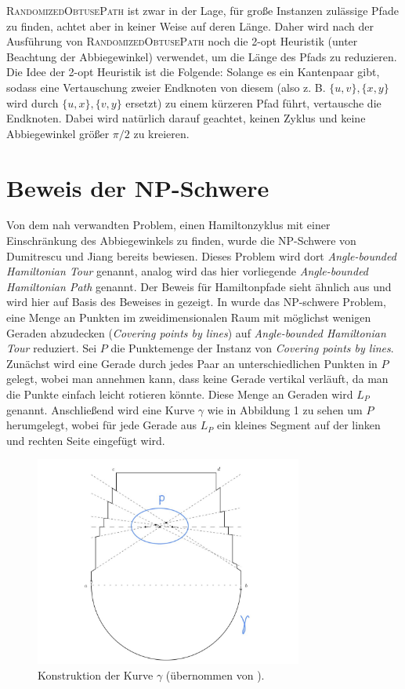 \documentclass[a4paper, 10pt, ngerman]{article}
\begin{document}
\textsc{RandomizedObtusePath} ist zwar in der Lage, für große Instanzen zulässige Pfade zu finden, achtet aber in keiner Weise auf deren Länge. Daher wird nach der Ausführung von \textsc{RandomizedObtusePath} noch die 2-opt Heuristik (unter Beachtung der Abbiegewinkel) verwendet, um die Länge des Pfads zu reduzieren. Die Idee der 2-opt Heuristik ist die Folgende: Solange es ein Kantenpaar gibt, sodass eine Vertauschung zweier Endknoten von diesem (also z. B. $\{u, v\}, \{x, y\}$ wird durch $\{u, x\}, \{v, y\}$ ersetzt) zu einem kürzeren Pfad führt, vertausche die Endknoten. Dabei wird natürlich darauf geachtet, keinen Zyklus und keine Abbiegewinkel größer $\pi / 2$ zu kreieren.

\section{Beweis der NP-Schwere}

Von dem nah verwandten Problem, einen Hamiltonzyklus mit einer Einschränkung des  Abbiegewinkels zu finden, wurde die NP-Schwere von Dumitrescu und Jiang \cite{nphard} bereits bewiesen. Dieses Problem wird dort \emph{Angle-bounded Hamiltonian Tour} genannt, analog wird das hier vorliegende \emph{Angle-bounded Hamiltonian Path} genannt. Der Beweis für Hamiltonpfade sieht ähnlich aus und wird hier auf Basis des Beweises in \cite{nphard} gezeigt. In \cite{nphard} wurde das NP-schwere Problem, eine Menge an Punkten im zweidimensionalen Raum mit möglichst wenigen Geraden abzudecken (\emph{Covering points by lines}) auf \emph{Angle-bounded Hamiltonian Tour} reduziert. Sei $P$ die Punktemenge der Instanz von \emph{Covering points by lines}. Zunächst wird eine Gerade durch jedes Paar an unterschiedlichen Punkten in $P$ gelegt, wobei man annehmen kann, dass keine Gerade vertikal verläuft, da man die Punkte einfach leicht rotieren könnte. Diese Menge an Geraden wird $L_P$ genannt. Anschließend wird eine Kurve $\gamma$ wie in Abbildung 1 zu sehen um $P$ herumgelegt, wobei für jede Gerade aus $L_P$ ein kleines Segment auf der linken und rechten Seite eingefügt wird.

\begin{figure}[h]
    \centering
    \includegraphics[width=250pt]{grafiken/wenigerkrumm-np1.jpg}
    \caption{Konstruktion der Kurve $\gamma$ (übernommen von \cite{nphard}).}
\end{figure}
\end{document}
